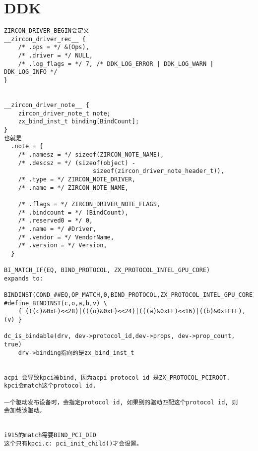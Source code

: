 \section{DDK}

\begin{verbatim}
ZIRCON_DRIVER_BEGIN会定义
__zircon_driver_rec__ {
    /* .ops = */ &(Ops),
    /* .driver = */ NULL,
    /* .log_flags = */ 7, /* DDK_LOG_ERROR | DDK_LOG_WARN | DDK_LOG_INFO */
}


__zircon_driver_note__ {
    zircon_driver_note_t note;
    zx_bind_inst_t binding[BindCount];
}
也就是
  .note = {
    /* .namesz = */ sizeof(ZIRCON_NOTE_NAME),              
    /* .descsz = */ (sizeof(object) -                       
                         sizeof(zircon_driver_note_header_t)), 
    /* .type = */ ZIRCON_NOTE_DRIVER,                      
    /* .name = */ ZIRCON_NOTE_NAME,  
    
    /* .flags = */ ZIRCON_DRIVER_NOTE_FLAGS,                    
    /* .bindcount = */ (BindCount),                             
    /* .reserved0 = */ 0,                                       
    /* .name = */ #Driver,                                      
    /* .vendor = */ VendorName,                                 
    /* .version = */ Version,            
  }

BI_MATCH_IF(EQ, BIND_PROTOCOL, ZX_PROTOCOL_INTEL_GPU_CORE)
expands to:

BINDINST(COND_##EQ,OP_MATCH,0,BIND_PROTOCOL,ZX_PROTOCOL_INTEL_GPU_CORE)
#define BINDINST(c,o,a,b,v) \
    { (((c)&0xF)<<28)|(((o)&0xF)<<24)|(((a)&0xFF)<<16)|((b)&0xFFFF),(v) }

dc_is_bindable(drv, dev->protocol_id,dev->props, dev->prop_count, true)
    drv->binding指向的是zx_bind_inst_t


acpi 会导致kpci被bind, 因为acpi protocol id 是ZX_PROTOCOL_PCIROOT.
kpci会match这个protocol id.

一个驱动发布设备时，会指定protocol id, 如果别的驱动匹配这个protocol id, 则
会加载该驱动。


i915的match需要BIND_PCI_DID
这个只有kpci.c: pci_init_child()才会设置。

\end{verbatim}